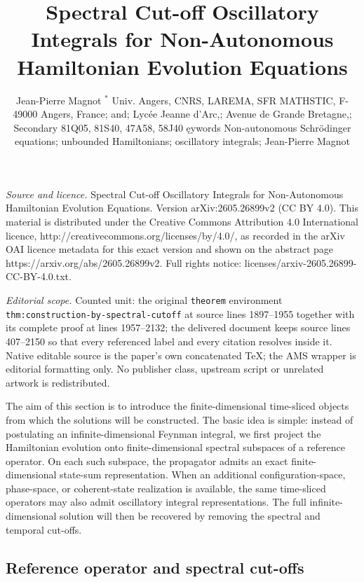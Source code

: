 \documentclass[10pt,a4paper]{amsart}
\begin{document}
\title[Spectral Cut-off Oscillatory Integrals for Non-Autonomous Ha]{Spectral Cut-off Oscillatory Integrals for Non-Autonomous Hamiltonian Evolution Equations}
\author{Jean-Pierre Magnot $^*$ Univ. Angers, CNRS, LAREMA, SFR MATHSTIC, F-49000 Angers, France; and; Lycée Jeanne d'Arc,; Avenue de Grande Bretagne,; Secondary 81Q05, 81S40, 47A58, 58J40 ęywords Non-autonomous Schrödinger equations; unbounded Hamiltonians; oscillatory integrals; Jean-Pierre Magnot}
\date{}
\maketitle
\noindent\emph{Source and licence.} Spectral Cut-off Oscillatory Integrals for Non-Autonomous Hamiltonian Evolution Equations. Version arXiv:2605.26899v2 (CC BY 4.0). This material is distributed under the Creative Commons Attribution 4.0 International licence, http://creativecommons.org/licenses/by/4.0/, as recorded in the arXiv OAI licence metadata for this exact version and shown on the abstract page https://arxiv.org/abs/2605.26899v2. Full rights notice: licenses/arxiv-2605.26899-CC-BY-4.0.txt.\par\smallskip
\noindent\textit{Editorial scope.} Counted unit: the original \texttt{theorem} environment \texttt{thm:construction-by-spectral-cutoff} at source lines 1897--1955 together with its complete proof at lines 1957--2132; the delivered document keeps source lines 407--2150 so that every referenced label and every citation resolves inside it. Native editable source is the paper's own concatenated TeX; the AMS wrapper is editorial formatting only. No publisher class, upstream script or unrelated artwork is redistributed.
\label{sec:cutoff-oscillatory-integrals}

The aim of this section is to introduce the finite-dimensional
time-sliced objects from which the solutions will be constructed.  The
basic idea is simple: instead of postulating an infinite-dimensional
Feynman integral, we first project the Hamiltonian evolution onto
finite-dimensional spectral subspaces of a reference operator.  On
each such subspace, the propagator admits an exact finite-dimensional
state-sum representation.  When an additional configuration-space,
phase-space, or coherent-state realization is available, the same
time-sliced operators may also admit oscillatory integral
representations.  The full infinite-dimensional solution will then be
recovered by removing the spectral and temporal cut-offs.

\subsection{Reference operator and spectral cut-offs}
\end{document}
